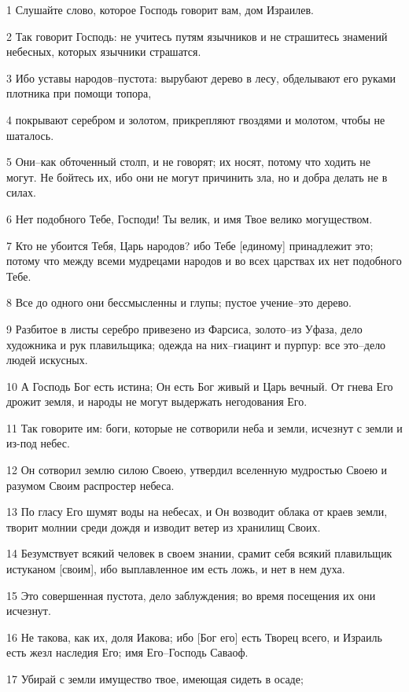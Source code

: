 \par 1 Слушайте слово, которое Господь говорит вам, дом Израилев.
\par 2 Так говорит Господь: не учитесь путям язычников и не страшитесь знамений небесных, которых язычники страшатся.
\par 3 Ибо уставы народов--пустота: вырубают дерево в лесу, обделывают его руками плотника при помощи топора,
\par 4 покрывают серебром и золотом, прикрепляют гвоздями и молотом, чтобы не шаталось.
\par 5 Они--как обточенный столп, и не говорят; их носят, потому что ходить не могут. Не бойтесь их, ибо они не могут причинить зла, но и добра делать не в силах.
\par 6 Нет подобного Тебе, Господи! Ты велик, и имя Твое велико могуществом.
\par 7 Кто не убоится Тебя, Царь народов? ибо Тебе [единому] принадлежит это; потому что между всеми мудрецами народов и во всех царствах их нет подобного Тебе.
\par 8 Все до одного они бессмысленны и глупы; пустое учение--это дерево.
\par 9 Разбитое в листы серебро привезено из Фарсиса, золото--из Уфаза, дело художника и рук плавильщика; одежда на них--гиацинт и пурпур: все это--дело людей искусных.
\par 10 А Господь Бог есть истина; Он есть Бог живый и Царь вечный. От гнева Его дрожит земля, и народы не могут выдержать негодования Его.
\par 11 Так говорите им: боги, которые не сотворили неба и земли, исчезнут с земли и из-под небес.
\par 12 Он сотворил землю силою Своею, утвердил вселенную мудростью Своею и разумом Своим распростер небеса.
\par 13 По гласу Его шумят воды на небесах, и Он возводит облака от краев земли, творит молнии среди дождя и изводит ветер из хранилищ Своих.
\par 14 Безумствует всякий человек в своем знании, срамит себя всякий плавильщик истуканом [своим], ибо выплавленное им есть ложь, и нет в нем духа.
\par 15 Это совершенная пустота, дело заблуждения; во время посещения их они исчезнут.
\par 16 Не такова, как их, доля Иакова; ибо [Бог его] есть Творец всего, и Израиль есть жезл наследия Его; имя Его--Господь Саваоф.
\par 17 Убирай с земли имущество твое, имеющая сидеть в осаде;
